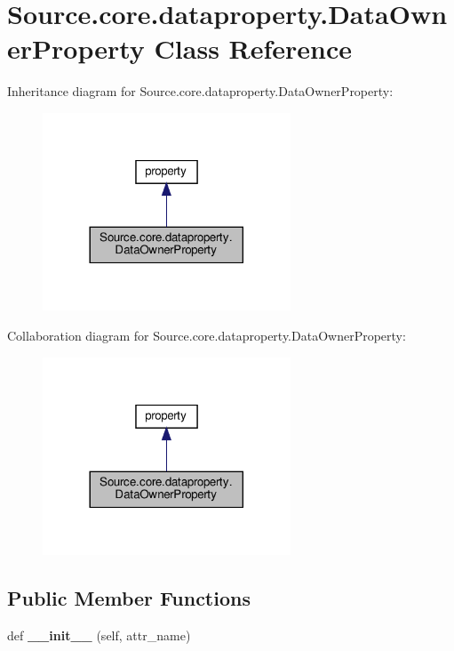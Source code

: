\hypertarget{classSource_1_1core_1_1dataproperty_1_1DataOwnerProperty}{}\section{Source.\+core.\+dataproperty.\+Data\+Owner\+Property Class Reference}
\label{classSource_1_1core_1_1dataproperty_1_1DataOwnerProperty}


Inheritance diagram for Source.\+core.\+dataproperty.\+Data\+Owner\+Property\+:\nopagebreak
\begin{figure}[H]
\begin{center}
\leavevmode
\includegraphics[width=209pt]{classSource_1_1core_1_1dataproperty_1_1DataOwnerProperty__inherit__graph}
\end{center}
\end{figure}


Collaboration diagram for Source.\+core.\+dataproperty.\+Data\+Owner\+Property\+:\nopagebreak
\begin{figure}[H]
\begin{center}
\leavevmode
\includegraphics[width=209pt]{classSource_1_1core_1_1dataproperty_1_1DataOwnerProperty__coll__graph}
\end{center}
\end{figure}
\subsection*{Public Member Functions}
\begin{DoxyCompactItemize}
\item 
\mbox{\label{classSource_1_1core_1_1dataproperty_1_1DataOwnerProperty_a42524065b086a21700354af955337fe5}} 
def {\bfseries \+\_\+\+\_\+init\+\_\+\+\_\+} (self, attr\+\_\+name)
\end{DoxyCompactItemize}
